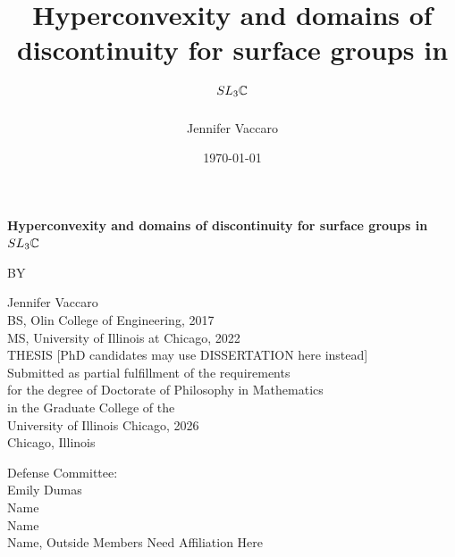 \documentclass[12pt,reqno,oneside]{amsbook}
\begin{document}
\newcommand{\thetitle}{Hyperconvexity and domains of discontinuity for surface groups in $SL_3\C$}

\newcommand{\institution}{University of Illinois Chicago} 
\newcommand{\degree}{Doctorate of Philosophy}
\newcommand{\programname}{Mathematics}
\newcommand{\committee}{Emily Dumas \\ Name \\ Name\\ Name, Outside Members Need Affiliation Here}
\newcommand{\theauthor}{Jennifer Vaccaro}
\newcommand{\priordegrees}{BS, Olin College of Engineering, 2017\\ MS, University of Illinois at Chicago, 2022}
\newcommand{\graduationyear}{2026}

\author{\theauthor}
\title{\thetitle}
\date{\today}

\frontmatter

\begin{titlepage}
    \centering
	{{\Large {\textbf{\thetitle}}}  \par}
    \vspace{2cm}
    {BY\par}
    \vspace{0.5cm}
    {\theauthor}\\
    {\priordegrees}\\
    \vspace{2cm}
	THESIS [PhD candidates may use DISSERTATION here instead]\\
	\vspace{1cm}
	Submitted as partial fulfillment of the requirements\\ \vspace{0.2cm}
	for the degree of {\degree} in {\programname} \\ \vspace{0.2cm}
	in the Graduate College of the \\  \vspace{0.2cm}
	University of Illinois Chicago, {\graduationyear}\\
	\vspace{1cm}
	Chicago, Illinois
		
	\raggedright
    \vfill
    Defense Committee: \\
    \committee \\
\end{titlepage}
\end{document}
